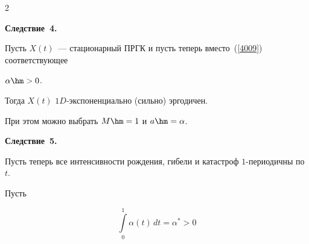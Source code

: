 \begin{multicols}{2}
\begin{figure}[b]
\begin{center}
{ \epsfxsize=163.445mm


 }

 \end{center}

 \vspace*{-16pt}

\begin{minipage}[t]{80mm}


\end{minipage}

\hfill

\begin{minipage}[t]{80mm}


\end{minipage}

\end{figure}









\medskip



\noindent

\textbf{Следствие~4.}\

Пусть $X(t)$~--- стационарный ПРГК и пусть теперь вместо~(\ref{4009}) соответствующее

$\alpha \hm> 0$.

Тогда $X(t)$  $1D$-экс\-по\-нен\-ци\-аль\-но (сильно) эргодичен.

При этом можно выбрать $M\hm=1$ и $a\hm = \alpha$.





\medskip



\noindent

\textbf{Следствие~5.}\

Пусть теперь все интенсивности рож\-де\-ния, гибели и катастроф  $1$-пе\-ри\-о\-дич\-ны по~$t$.

Пусть

\begin{equation*}

\int\limits_0^{1}\alpha\left( t\right)\, dt = \alpha^* > 0


\end{equation*}


\end{multicols}
